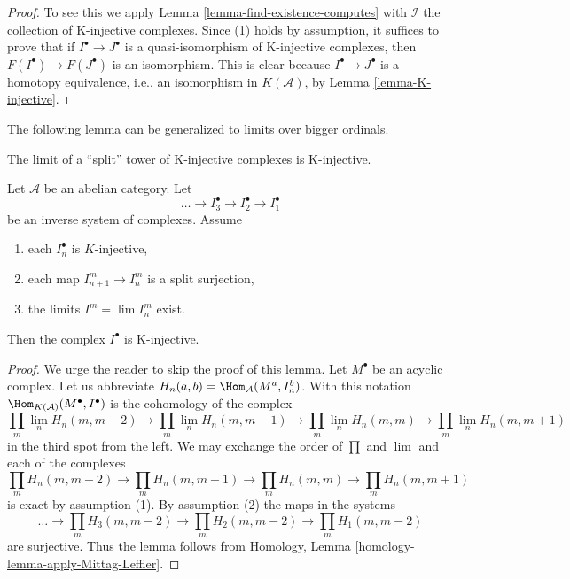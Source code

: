 \begin{proof}
To see this we apply
Lemma \ref{lemma-find-existence-computes}
with $\mathcal{I}$ the collection of K-injective complexes. Since (1)
holds by assumption, it suffices to prove that if $I^\bullet \to J^\bullet$
is a quasi-isomorphism of K-injective complexes, then
$F(I^\bullet) \to F(J^\bullet)$ is an isomorphism. This is clear because
$I^\bullet \to J^\bullet$ is a homotopy equivalence, i.e., an
isomorphism in $K(\mathcal{A})$, by
Lemma \ref{lemma-K-injective}.
\end{proof}

\noindent
The following lemma can be generalized to limits over bigger ordinals.

\begin{lemma}
\label{lemma-limit-K-injectives}
\begin{slogan}
The limit of a ``split'' tower of K-injective complexes is K-injective.
\end{slogan}
Let $\mathcal{A}$ be an abelian category. Let
$$
\ldots \to I_3^\bullet \to I_2^\bullet \to I_1^\bullet
$$
be an inverse system of complexes. Assume
\begin{enumerate}
\item each $I_n^\bullet$ is $K$-injective,
\item each map $I_{n + 1}^m \to I_n^m$ is a split surjection,
\item the limits $I^m = \lim I_n^m$ exist.
\end{enumerate}
Then the complex $I^\bullet$ is K-injective.
\end{lemma}

\begin{proof}
We urge the reader to skip the proof of this lemma.
Let $M^\bullet$ be an acyclic complex. Let us abbreviate
$H_n(a, b) = \Hom_\mathcal{A}(M^a, I_n^b)$. With this notation
$\Hom_{K(\mathcal{A})}(M^\bullet, I^\bullet)$ is the cohomology
of the complex
$$
\prod_m \lim\limits_n H_n(m, m - 2)
\to
\prod_m \lim\limits_n H_n(m, m - 1)
\to
\prod_m \lim\limits_n H_n(m, m)
\to
\prod_m \lim\limits_n H_n(m, m + 1)
$$
in the third spot from the left.
We may exchange the order of $\prod$ and $\lim$ and each of the complexes
$$
\prod_m H_n(m, m - 2)
\to
\prod_m H_n(m, m - 1)
\to
\prod_m H_n(m, m)
\to
\prod_m H_n(m, m + 1)
$$
is exact by assumption (1). By assumption (2) the maps in the systems
$$
\ldots \to
\prod_m H_3(m, m - 2) \to
\prod_m H_2(m, m - 2) \to
\prod_m H_1(m, m - 2)
$$
are surjective. Thus the lemma follows from
Homology, Lemma \ref{homology-lemma-apply-Mittag-Leffler}.
\end{proof}

